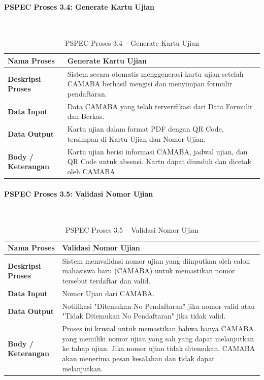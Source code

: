 
\paragraph{PSPEC Proses 3.4: Generate Kartu Ujian}~\\
\begin{longtable}{|p{}|p{}|}
	\caption{PSPEC Proses 3.4 -- Generate Kartu Ujian}
	\label{table:3.pspec34}\\
	\hline
	\textbf{Nama Proses} & Generate Kartu Ujian \\
	\hline
	\textbf{Deskripsi Proses} & Sistem secara otomatis menggenerasi kartu ujian setelah CAMABA berhasil mengisi dan menyimpan formulir pendaftaran. \\
	\hline
	\textbf{Data Input} & Data CAMABA yang telah terverifikasi dari Data Formulir dan Berkas. \\
	\hline
	\textbf{Data Output} & Kartu ujian dalam format PDF dengan QR Code, tersimpan di Kartu Ujian dan Nomor Ujian. \\
	\hline
	\textbf{Body / Keterangan} & Kartu ujian berisi informasi CAMABA, jadwal ujian, dan QR Code untuk absensi. Kartu dapat diunduh dan dicetak oleh CAMABA. \\
	\hline
\end{longtable}

\paragraph{PSPEC Proses 3.5: Validasi Nomor Ujian}~\\
\begin{longtable}{|p{}|p{}|}
	\caption{PSPEC Proses 3.5 -- Validasi Nomor Ujian}
	\label{table:3.pspec35}\\
	\hline
	\textbf{Nama Proses} & Validasi Nomor Ujian \\
	\hline
	\textbf{Deskripsi Proses} & Sistem memvalidasi nomor ujian yang diinputkan oleh calon mahasiswa baru (CAMABA) untuk memastikan nomor tersebut terdaftar dan valid. \\
	\hline
	\textbf{Data Input} & Nomor Ujian dari CAMABA. \\
	\hline
	\textbf{Data Output} & Notifikasi "Ditemukan No Pendaftaran" jika nomor valid atau "Tidak Ditemukan No Pendaftaran" jika tidak valid. \\
	\hline
	\textbf{Body / Keterangan} & Proses ini krusial untuk memastikan bahwa hanya CAMABA yang memiliki nomor ujian yang sah yang dapat melanjutkan ke tahap ujian. Jika nomor ujian tidak ditemukan, CAMABA akan menerima pesan kesalahan dan tidak dapat melanjutkan. \\
	\hline
\end{longtable}

